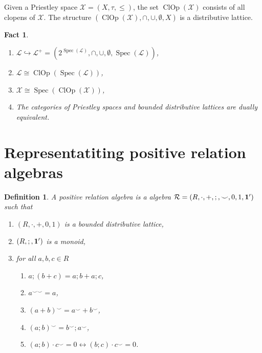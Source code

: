 \documentclass[a4paper]{article}
\theoremstyle{defin}
\newtheorem{definition}{Definition}
\theoremstyle{theorem}
\theoremstyle{claim}
\theoremstyle{prop}
\theoremstyle{lemma}
\theoremstyle{fact}
\newtheorem{fact}{Fact}
\theoremstyle{ex}
\theoremstyle{col}
\begin{document}
Given a Priestley space $\mathcal{X} = (X, \tau, \leq)$, the set $\operatorname{ClOp}(\mathcal{X})$ consists of all clopens of $\mathcal{X}$. The structure $(\operatorname{ClOp}(\mathcal{X}), \cap, \cup, \emptyset, X)$ is a distributive lattice.

\begin{fact}

\begin{enumerate} Let $\mathcal{L}$ be a distributive lattice and let $\mathcal{X}$ be a Priestley space:
\item $\mathcal{L} \hookrightarrow \mathcal{L}^{+} = (2^{\operatorname{Spec}(\mathcal{L})}, \cap, \cup, \emptyset, \operatorname{Spec}(\mathcal{L}))$,
\item $\mathcal{L} \cong \operatorname{ClOp}(\operatorname{Spec}(\mathcal{L}))$,
\item $\mathcal{X} \cong \operatorname{Spec}(\operatorname{ClOp}(\mathcal{X}))$,
\item The categories of Priestley spaces and bounded distributive lattices are dually equivalent.
\end{enumerate}
\end{fact}

\section{Representatiting positive relation algebras}

\begin{definition}

A positive relation algebra is a algebra $\mathcal{R} = (R, \cdot, +, ;, \smile, 0, 1, {\bf 1}')$ such that
\begin{enumerate}
\item $(R, \cdot, +, 0, 1)$ is a bounded distributive lattice,
\item $(R, ;, {\bf 1}')$ is a monoid,
\item for all $a, b, c \in R$
\begin{enumerate}
\item $a ; (b + c) = a ; b + a ; c$,
\item $a^{\smile \smile} = a$,
\item $(a + b)^{\smile} = a^{\smile} + b^{\smile}$,
\item $(a ; b)^{\smile} = b^{\smile} ; a^{\smile}$,
\item $(a ; b) \cdot c^{\smile} = 0 \leftrightarrow (b ; c) \cdot c^{\smile} = 0$.
\end{enumerate}
\end{enumerate}
\end{definition}
\end{document}
